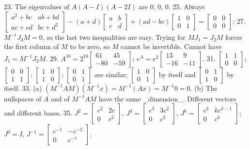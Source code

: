 23. The eigenvalues of \(A(A-I)(A-2I)\) are \(0\), \(0\), \(0\).
25. Always \(\begin{bmatrix}a^{2}+bc&ab+bd\\ ac+cd&bc+d^{2}\end{bmatrix}-(a+d)\begin{bmatrix}a&b\\ c&d\end{bmatrix}+(ad-bc)\begin{bmatrix}1&0\\ 0&1\end{bmatrix}=\begin{bmatrix}0&0\\ 0&0\end{bmatrix}\);
27. \(M^{-1}J_{3}M=0\), so the last two inequalities are easy. Trying for \(MJ_{1}=J_{2}M\) forces the first column of \(M\) to be zero, so \(M\) cannot be invertible. Cannot have \(J_{1}=M^{-1}J_{2}M\).
29. \(A^{10}=2^{10}\begin{bmatrix}61&45\\ -80&-59\end{bmatrix}\); \(e^{A}=e^{2}\begin{bmatrix}13&9\\ -16&-11\end{bmatrix}\).
31. \(\begin{bmatrix}1&1\\ 0&0\end{bmatrix}\); \(\begin{bmatrix}0&0\\ 1&1\end{bmatrix}\); \(\begin{bmatrix}1&0\\ 1&0\end{bmatrix}\); \(\begin{bmatrix}0&1\\ 0&1\end{bmatrix}\) are similar; \(\begin{bmatrix}1&0\\ 0&1\end{bmatrix}\) by itself and \(\begin{bmatrix}0&1\\ 1&0\end{bmatrix}\) by itself.
33. (a) \((M^{-1}AM)(M^{-1}x)=M^{-1}(Ax)=M^{-1}0=0\). (b) The nullspaces of \(A\) and of \(M^{-1}AM\) have the same _dimension_. Different vectors and different bases.
35. \(J^{2}=\begin{bmatrix}c^{2}&2c\\ 0&c^{2}\end{bmatrix}\), \(J^{3}=\begin{bmatrix}c^{3}&3c^{2}\\ 0&c^{3}\end{bmatrix}\), \(J^{k}=\begin{bmatrix}c^{k}&kc^{k-1}\\ 0&c^{k}\end{bmatrix}\); \(J^{0}=I\), \(J^{-1}=\begin{bmatrix}c^{-1}&-c^{-2}\\ 0&c^{-1}\end{bmatrix}\).
